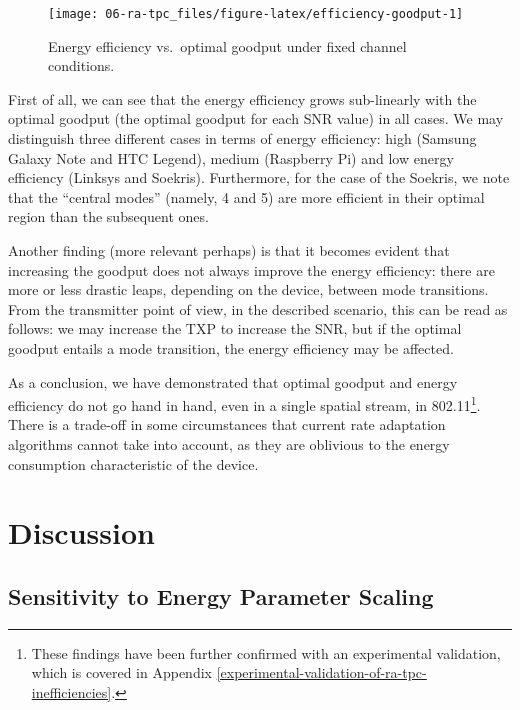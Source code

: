 \documentclass[twoside,nohyper]{tufte-book}
\theoremstyle{definition}
\theoremstyle{definition}
\theoremstyle{definition}
\theoremstyle{remark}
\begin{document}
\begin{figure}

{\centering \texttt{[image: 06-ra-tpc\_files/figure-latex/efficiency-goodput-1]} 

}

\caption[Energy efficiency vs.~optimal goodput under
fixed channel conditions.]{Energy efficiency vs.~optimal goodput under
fixed channel conditions.}\label{fig:efficiency-goodput}
\end{figure}

First of all, we can see that the energy efficiency grows sub-linearly
with the optimal goodput (the optimal goodput for each SNR value) in all
cases. We may distinguish three different cases in terms of energy
efficiency: high (Samsung Galaxy Note and HTC Legend), medium (Raspberry
Pi) and low energy efficiency (Linksys and Soekris). Furthermore, for
the case of the Soekris, we note that the ``central modes'' (namely, 4
and 5) are more efficient in their optimal region than the subsequent
ones.

Another finding (more relevant perhaps) is that it becomes evident that
increasing the goodput does not always improve the energy efficiency:
there are more or less drastic leaps, depending on the device, between
mode transitions. From the transmitter point of view, in the described
scenario, this can be read as follows: we may increase the TXP to
increase the SNR, but if the optimal goodput entails a mode transition,
the energy efficiency may be affected.

As a conclusion, we have demonstrated that optimal goodput and energy
efficiency do not go hand in hand, even in a single spatial stream, in
802.11\footnote{These findings have been further confirmed with an
  experimental validation, which is covered in Appendix
  \ref{experimental-validation-of-ra-tpc-inefficiencies}.}. There is a
trade-off in some circumstances that current rate adaptation algorithms
cannot take into account, as they are oblivious to the energy
consumption characteristic of the device.

\section{Discussion}\label{discussion}

\subsection{Sensitivity to Energy Parameter
Scaling}\label{sensitivity-to-energy-parameter-scaling}
\end{document}
